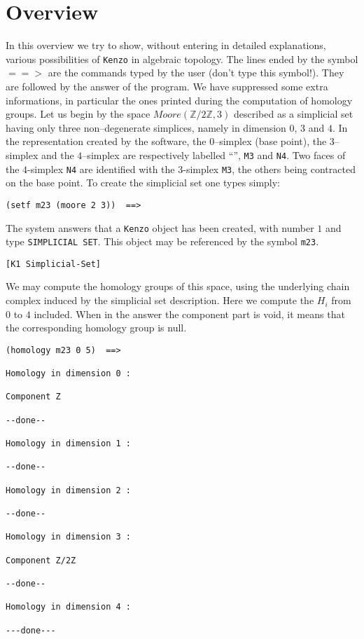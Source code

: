 \setcounter{chapter}{-1}
\chapter {Overview}

In this overview we try to  show, without entering in detailed
explanations, various possibilities of {\tt Kenzo} in algebraic topology.
The lines ended by the symbol $==>$ are the commands typed by the user
(don't type this symbol!).
They are followed by the answer of the program. We have suppressed some
extra informations, in particular the ones printed during the computation
of homology groups.
\vskip 0.5cm
Let us begin by the space $Moore(\mathbb{Z}/2\mathbb{Z}, 3)$ described as a simplicial set
having only three non--degenerate simplices, namely in dimension
$0$, $3$ and $4$. In the  representation created by the software, the $0$--simplex (base point),
the $3$--simplex and the $4$--simplex are respectively labelled
``{\tt *}'', {\tt M3} and {\tt N4}. Two faces of the $4$-simplex {\tt N4} are identified with the
$3$-simplex {\tt M3}, the others being contracted on the base point. To create the simplicial set
one types simply:
{\footnotesize\begin{verbatim}
(setf m23 (moore 2 3))  ==>
\end{verbatim}}
The system answers that a {\tt Kenzo} object has been created, with number $1$ and
type {\tt SIMPLICIAL SET}. This object may be referenced  by the symbol {\tt m23}.
{\footnotesize\begin{verbatim}
[K1 Simplicial-Set]
\end{verbatim}}
We may compute the homology groups of this space, using the underlying chain complex
induced by the simplicial set description. Here we compute the $ H_i$ from $0$ to $4$ included.
When in the answer the component part is void, it means that the corresponding homology group is null.
{\footnotesize\begin{verbatim}
(homology m23 0 5)  ==>

Homology in dimension 0 :

Component Z

--done--

Homology in dimension 1 :

--done--

Homology in dimension 2 :

--done--

Homology in dimension 3 :

Component Z/2Z

--done--

Homology in dimension 4 :

---done---
\end{verbatim}}
